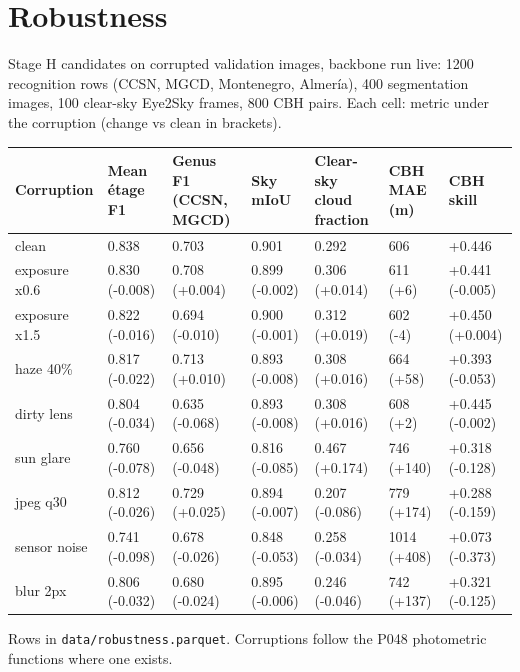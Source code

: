 \section{Robustness}

Stage H candidates on corrupted validation images, backbone run live: 1200 recognition rows (CCSN, MGCD, Montenegro, Almería), 400 segmentation images, 100 clear-sky Eye2Sky frames, 800 CBH pairs. Each cell: metric under the corruption (change vs clean in brackets).

\begin{center}{\scriptsize\setlength{\tabcolsep}{3pt}
\begin{tabular}{lllllll}
\toprule
Corruption & Mean étage F1 & Genus F1 (CCSN, MGCD) & Sky mIoU & Clear-sky cloud fraction & CBH MAE (m) & CBH skill \\
\midrule
clean & 0.838 & 0.703 & 0.901 & 0.292 & 606 & +0.446 \\
exposure x0.6 & 0.830 (-0.008) & 0.708 (+0.004) & 0.899 (-0.002) & 0.306 (+0.014) & 611 (+6) & +0.441 (-0.005) \\
exposure x1.5 & 0.822 (-0.016) & 0.694 (-0.010) & 0.900 (-0.001) & 0.312 (+0.019) & 602 (-4) & +0.450 (+0.004) \\
haze 40\% & 0.817 (-0.022) & 0.713 (+0.010) & 0.893 (-0.008) & 0.308 (+0.016) & 664 (+58) & +0.393 (-0.053) \\
dirty lens & 0.804 (-0.034) & 0.635 (-0.068) & 0.893 (-0.008) & 0.308 (+0.016) & 608 (+2) & +0.445 (-0.002) \\
sun glare & 0.760 (-0.078) & 0.656 (-0.048) & 0.816 (-0.085) & 0.467 (+0.174) & 746 (+140) & +0.318 (-0.128) \\
jpeg q30 & 0.812 (-0.026) & 0.729 (+0.025) & 0.894 (-0.007) & 0.207 (-0.086) & 779 (+174) & +0.288 (-0.159) \\
sensor noise & 0.741 (-0.098) & 0.678 (-0.026) & 0.848 (-0.053) & 0.258 (-0.034) & 1014 (+408) & +0.073 (-0.373) \\
blur 2px & 0.806 (-0.032) & 0.680 (-0.024) & 0.895 (-0.006) & 0.246 (-0.046) & 742 (+137) & +0.321 (-0.125) \\
\bottomrule
\end{tabular}}
\end{center}

Rows in \texttt{data/robustness.parquet}. Corruptions follow the P048 photometric functions where one exists.

